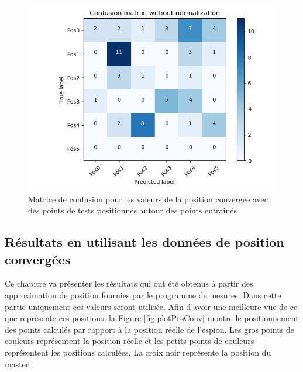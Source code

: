 \begin{figure}[htp]
	\begin{center}
		\includegraphics[scale=0.5]{figures/mat_pos_Tx.png}
		\caption{Matrice de confusion pour les valeurs de la position convergée avec des points de tests positionnés autour des points entrainés}
		\label{fig:matPosTx} %
	\end{center}
\end{figure}

\subsection{Résultats en utilisant les données de position convergées}
Ce chapitre va présenter les résultats qui ont été obtenus à partir des approximation de position fournies par le programme de mesures. Dans cette partie uniquement ces valeurs seront utilisée. Afin d'avoir une meilleure vue de ce que représente ces positions, la Figure \ref{fig:plotPosConv} montre le positionnement des points calculés par rapport à la position réelle de l'espion. Les gros points de couleurs représentent la position réelle et les petits points de couleurs représentent les positions calculées. La croix noir représente la position du master. 

